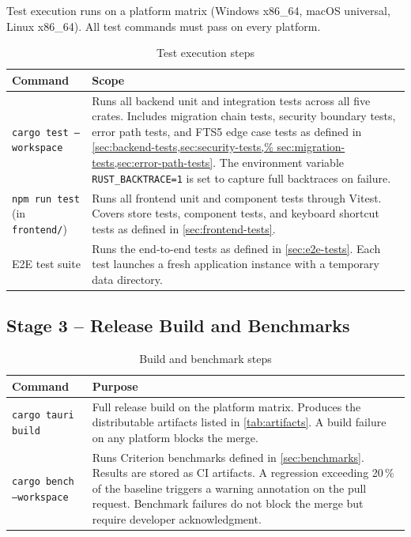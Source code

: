 \documentclass[a4paper, 11pt, oneside]{report}
\begin{document}
Test execution runs on a platform matrix (Windows x86\_64, macOS
universal, Linux x86\_64).  All test commands must pass on every
platform.

\begin{table}[H]
  \centering
  \caption{Test execution steps}
  \label{tab:ci-tests}
  \begin{tabularx}{\textwidth}{l X}
    \toprule
    \textbf{Command} & \textbf{Scope} \\
    \midrule
    \texttt{cargo test --workspace} &
      Runs all backend unit and integration tests across all five
      crates.  Includes migration chain tests, security boundary
      tests, error path tests, and FTS5 edge case tests as
      defined in \cref{sec:backend-tests,sec:security-tests,%
      sec:migration-tests,sec:error-path-tests}.  The environment
      variable \texttt{RUST\_BACKTRACE=1} is set to capture full
      backtraces on failure. \\
    \texttt{npm run test} (in \texttt{frontend/}) &
      Runs all frontend unit and component tests through Vitest.
      Covers store tests, component tests, and keyboard shortcut
      tests as defined in \cref{sec:frontend-tests}. \\
    E2E test suite &
      Runs the end-to-end tests as defined in
      \cref{sec:e2e-tests}.  Each test launches a fresh
      application instance with a temporary data directory. \\
    \bottomrule
  \end{tabularx}
\end{table}

\subsection{Stage 3 -- Release Build and Benchmarks}
\label{sec:ci-build}

\begin{table}[H]
  \centering
  \caption{Build and benchmark steps}
  \label{tab:ci-build}
  \begin{tabularx}{\textwidth}{l X}
    \toprule
    \textbf{Command} & \textbf{Purpose} \\
    \midrule
    \texttt{cargo tauri build} &
      Full release build on the platform matrix.  Produces the
      distributable artifacts listed in \cref{tab:artifacts}.
      A build failure on any platform blocks the merge. \\
    \texttt{cargo bench --workspace} &
      Runs Criterion benchmarks defined in \cref{sec:benchmarks}.
      Results are stored as CI artifacts.  A regression exceeding
      20\,\% of the baseline triggers a warning annotation on
      the pull request.  Benchmark failures do not block the
      merge but require developer acknowledgment. \\
    \bottomrule
  \end{tabularx}
\end{table}
\end{document}
